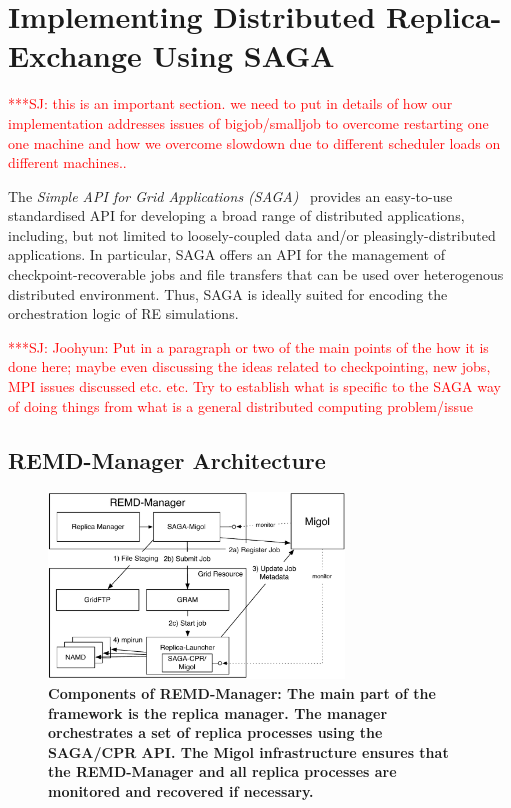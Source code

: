 \documentclass{rspublic}
\newcommand{\jhanote}[1]{ {\textcolor{red} { ***SJ: #1 }}}
\newcommand{\jhanote}[1]{}
\begin{document}

\section{Implementing Distributed Replica-Exchange Using SAGA}

\jhanote{this is an important section. we need to put in details of
  how our implementation addresses issues of bigjob/smalljob to
  overcome restarting one one machine and how we overcome slowdown due
  to different scheduler loads on different machines..}

The \emph{Simple API for Grid Applications (SAGA)}~\citep{saga_gfd90}
provides an easy-to-use standardised API for developing a broad range
of distributed applications, including, but not limited to
loosely-coupled data and/or pleasingly-distributed applications.  
In particular, SAGA offers an API for the management of
checkpoint-recoverable jobs and file transfers that can be used over
heterogenous distributed environment. Thus, SAGA is ideally suited for
encoding the orchestration logic of RE simulations.

\jhanote{Joohyun: Put in a paragraph or two of the main points of the
  how it is done here; maybe even discussing the ideas related to
  checkpointing, new jobs, MPI issues discussed etc. etc. Try to
  establish what is specific to the SAGA way of doing things from what
  is a general distributed computing problem/issue}
          
\subsection{REMD-Manager Architecture}
\begin{figure}[t]
      \centering
          \includegraphics[width=0.7\textwidth]{REMDgManager-architecture.pdf}
          \caption{\footnotesize \bf Components of REMD-Manager: The
            main part of the framework is the replica manager. The
            manager orchestrates a set of replica processes using the
            SAGA/CPR API. The Migol infrastructure ensures that the
            REMD-Manager and all replica processes are monitored and
            recovered if necessary.}
      \label{fig:REMD-Manager-architecture}
\end{figure}
\end{document}
